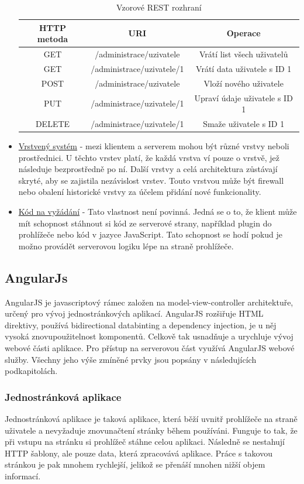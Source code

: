 \documentclass[czech,master,public,dept460,male,cpdeclaration,twoside]{diploma}
\begin{document}
\begin{itemize}
\begin{table}[H]
	\centering
	\caption{Vzorové REST rozhraní}
	\label{tab:REST}
	\begin{tabular}{|c|c|c|}
		\hline
		{\bf HTTP metoda} & {\bf URI} & {\bf Operace} \\
		\hline
		GET & /administrace/uzivatele & Vrátí list všech uživatelů \\
		\hline
		GET & /administrace/uzivatele/1 & Vrátí data uživatele s ID 1 \\
		\hline
		POST & /administrace/uzivatele & Vloží nového uživatele \\
		\hline
		PUT & /administrace/uzivatele/1 & Upraví údaje uživatele s ID 1 \\
		\hline
		DELETE & /administrace/uzivatele/1 & Smaže uživatele s ID 1 \\
		\hline
	\end{tabular}
\end{table}
	\item \underline{Vrstvený systém} - mezi klientem a serverem mohou být různé vrstvy neboli prostřednici. U těchto vrstev platí, že každá vrstva ví pouze o vrstvě, jež následuje bezprostředně po ní. Další vrstvy a celá architektura zůstávají skryté, aby se zajistila nezávislost vrstev. Touto vrstvou může být firewall nebo obalení historické vrstvy za účelem přidání nové funkcionality. 
	\item \underline{Kód na vyžádání} - Tato vlastnost není povinná. Jedná se o to, že klient může mít schopnost stáhnout si kód ze serverové strany, například plugin do prohlížeče nebo kód v jazyce JavaScript. Tato schopnost se hodí pokud je možno provádět serverovou logiku lépe na straně prohlížeče.
\end{itemize}
	
\subsection{AngularJs}
AngularJS je javascriptový rámec založen na model-view-controller architektuře, určený pro vývoj jednostránkových aplikací. AngularJS rozšiřuje HTML direktivy, používá bidirectional databinting a dependency injection, je u něj vysoká znovupoužitelnost komponentů. Celkově tak usnadňuje a urychluje vývoj webové části aplikace. Pro přístup na serverovou část využívá AngularJS webové služby. Všechny jeho výše zmíněné prvky jsou popsány v následujících podkapitolách. \cite{coJeAngular} \cite{angulartutorial}

\subsubsection{Jednostránková aplikace}
Jednostránková aplikace je taková aplikace, která běží uvnitř prohlížeče na straně uživatele a nevyžaduje znovunačtení stránky během používáni. Funguje to tak, že při vstupu na stránku si prohlížeč stáhne celou aplikaci. Následně se nestahují HTTP šablony, ale pouze data, která zpracovává aplikace. Práce s takovou stránkou je pak mnohem rychlejší, jelikož se přenáší mnohen nižší objem informací. \cite{SPA}
\end{document}
